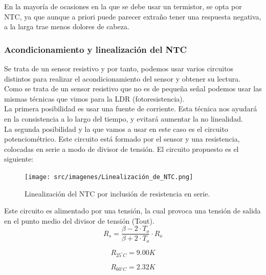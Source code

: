 \documentclass[12pt]{article}
\begin{document}
En la mayoría de ocasiones en la que se debe usar un termistor, se opta por NTC, ya que aunque a priori puede parecer extraño tener una respuesta negativa, a la larga trae menos dolores de cabeza. \\

\subsubsection{Acondicionamiento y linealización del NTC}

Se trata de un sensor resistivo y por tanto, podemos usar varios circuitos distintos para realizar el acondicionamiento del sensor y obtener su lectura. \\

Como se trata de un sensor resistivo que no es de pequeña señal podemos usar las mismas técnicas que vimos para la LDR (fotoresistencia). \\

La primera posibilidad es usar una fuente de corriente. Esta técnica nos ayudará en la consistencia a lo largo del tiempo, y evitará aumentar la no linealidad. \\

La segunda posibilidad y la que vamos a usar en este caso es el circuito potenciométrico. Este circuito está formado por el sensor y una resistencia, colocadas en serie a modo de divisor de tensión. El circuito propuesto es el siguiente:

\begin{figure}[H]
\centering
\texttt{[image: src/imagenes/Linealización\_de\_NTC.png]}
\label{fgr:Flujo_principal}
\caption{Linealización del NTC por inclusión de resistencia en serie.}
\end{figure}

Este circuito es alimentado por una tensión, la cual provoca una tensión de salida en el punto medio del divisor de tensión (Tout). \\

\begin{equation*}
	R_{s} = \frac{\beta - 2 \cdot T_{o}}{\beta + 2 \cdot T_{o}} \cdot R_{o}
\end{equation*}

\begin{equation*}
	R_{25^{\circ}C} = 9.00K
\end{equation*}

\begin{equation*}
	R_{60^{\circ}C} = 2.32K
\end{equation*}
\end{document}
